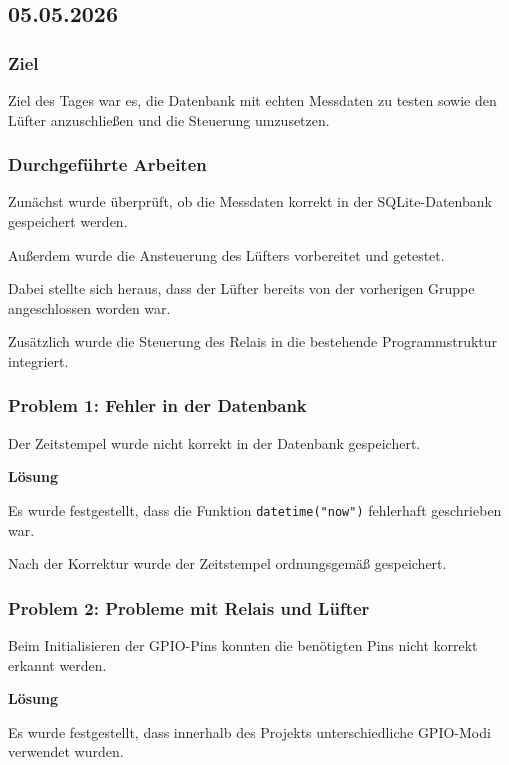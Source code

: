 \subsection{05.05.2026}

\subsubsection{Ziel}

Ziel des Tages war es, die Datenbank mit
echten Messdaten zu testen sowie den Lüfter
anzuschließen und die Steuerung umzusetzen.

\subsubsection{Durchgeführte Arbeiten}

Zunächst wurde überprüft, ob die Messdaten
korrekt in der SQLite-Datenbank gespeichert
werden.

Außerdem wurde die Ansteuerung des Lüfters
vorbereitet und getestet.

Dabei stellte sich heraus, dass der Lüfter
bereits von der vorherigen Gruppe angeschlossen
worden war.

Zusätzlich wurde die Steuerung des Relais
in die bestehende Programmstruktur integriert.

\subsubsection{Problem 1: Fehler in der Datenbank}

Der Zeitstempel wurde nicht korrekt in der
Datenbank gespeichert.

\textbf{Lösung}

Es wurde festgestellt, dass die Funktion
\texttt{datetime("now")} fehlerhaft geschrieben
war.

Nach der Korrektur wurde der Zeitstempel
ordnungsgemäß gespeichert.

\subsubsection{Problem 2: Probleme mit Relais und Lüfter}

Beim Initialisieren der GPIO-Pins konnten
die benötigten Pins nicht korrekt erkannt
werden.

\textbf{Lösung}

Es wurde festgestellt, dass innerhalb des
Projekts unterschiedliche GPIO-Modi verwendet
wurden.


